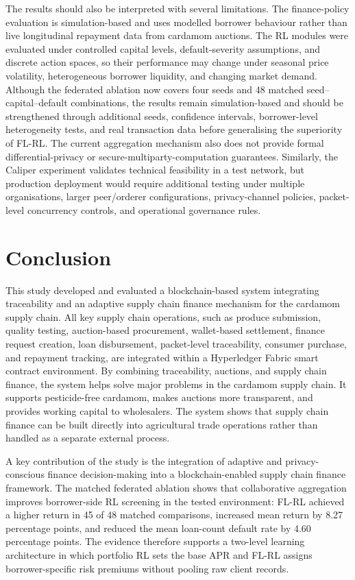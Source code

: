 \documentclass[12pt]{article}
\begin{document}
The results should also be interpreted with several limitations. The finance-policy evaluation is simulation-based and uses modelled borrower behaviour rather than live longitudinal repayment data from cardamom auctions. The RL modules were evaluated under controlled capital levels, default-severity assumptions, and discrete action spaces, so their performance may change under seasonal price volatility, heterogeneous borrower liquidity, and changing market demand. Although the federated ablation now covers four seeds and 48 matched seed--capital--default combinations, the results remain simulation-based and should be strengthened through additional seeds, confidence intervals, borrower-level heterogeneity tests, and real transaction data before generalising the superiority of FL-RL. The current aggregation mechanism also does not provide formal differential-privacy or secure-multiparty-computation guarantees. Similarly, the Caliper experiment validates technical feasibility in a test network, but production deployment would require additional testing under multiple organisations, larger peer/orderer configurations, privacy-channel policies, packet-level concurrency controls, and operational governance rules.
\section{Conclusion}

This study developed and evaluated a blockchain-based system integrating traceability and an adaptive supply chain finance mechanism for the cardamom supply chain. All key supply chain operations, such as produce submission, quality testing, auction-based procurement, wallet-based settlement, finance request creation, loan disbursement, packet-level traceability, consumer purchase, and repayment tracking, are integrated within a Hyperledger Fabric smart contract environment. By combining traceability, auctions, and supply chain finance, the system helps solve major problems in the cardamom supply chain. It supports pesticide-free cardamom, makes auctions more transparent, and provides working capital to wholesalers. The system shows that supply chain finance can be built directly into agricultural trade operations rather than handled as a separate external process.

A key contribution of the study is the integration of adaptive and privacy-conscious finance decision-making into a blockchain-enabled supply chain finance framework. The matched federated ablation shows that collaborative aggregation improves borrower-side RL screening in the tested environment: FL-RL achieved a higher return in 45 of 48 matched comparisons, increased mean return by 8.27 percentage points, and reduced the mean loan-count default rate by 4.60 percentage points. The evidence therefore supports a two-level learning architecture in which portfolio RL sets the base APR and FL-RL assigns borrower-specific risk premiums without pooling raw client records.
\end{document}
